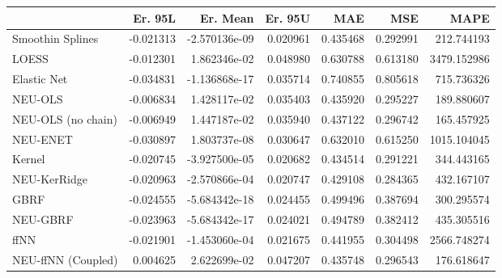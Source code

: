 \begin{tabular}{lrrrrrr}
\toprule
{} &   Er. 95L &      Er. Mean &   Er. 95U &       MAE &       MSE &         MAPE \\
\midrule
Smoothin Splines   & -0.021313 & -2.570136e-09 &  0.020961 &  0.435468 &  0.292991 &   212.744193 \\
LOESS              & -0.012301 &  1.862346e-02 &  0.048980 &  0.630788 &  0.613180 &  3479.152986 \\
Elastic Net        & -0.034831 & -1.136868e-17 &  0.035714 &  0.740855 &  0.805618 &   715.736326 \\
NEU-OLS            & -0.006834 &  1.428117e-02 &  0.035403 &  0.435920 &  0.295227 &   189.880607 \\
NEU-OLS (no chain) & -0.006949 &  1.447187e-02 &  0.035940 &  0.437122 &  0.296742 &   165.457925 \\
NEU-ENET           & -0.030897 &  1.803737e-08 &  0.030647 &  0.632010 &  0.615250 &  1015.104045 \\
Kernel             & -0.020745 & -3.927500e-05 &  0.020682 &  0.434514 &  0.291221 &   344.443165 \\
NEU-KerRidge       & -0.020963 & -2.570866e-04 &  0.020747 &  0.429108 &  0.284365 &   432.167107 \\
GBRF               & -0.024555 & -5.684342e-18 &  0.024455 &  0.499496 &  0.387694 &   300.295574 \\
NEU-GBRF           & -0.023963 & -5.684342e-17 &  0.024021 &  0.494789 &  0.382412 &   435.305516 \\
ffNN               & -0.021901 & -1.453060e-04 &  0.021675 &  0.441955 &  0.304498 &  2566.748274 \\
NEU-ffNN (Coupled) &  0.004625 &  2.622699e-02 &  0.047207 &  0.435748 &  0.296543 &   176.618647 \\
\bottomrule
\end{tabular}
